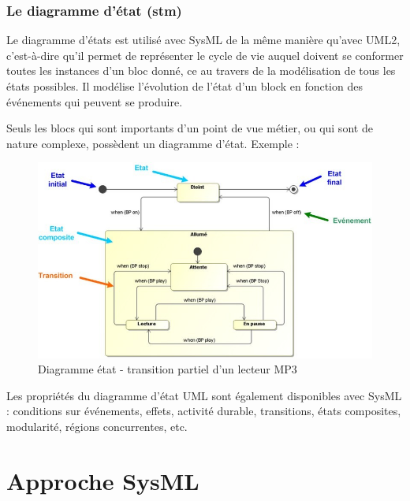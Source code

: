 \documentclass[12pt,a4paper]{report}
\begin{document}
\subsubsection{ Le diagramme d'\'{e}tat (stm)}

\noindent \begin{flushleft}
	
	
	\noindent Le diagramme d'\'{e}tats est utilis\'{e} avec SysML de la m\^{e}me mani\`{e}re qu'avec UML2, c'est-\`{a}-dire qu'il permet de repr\'{e}senter le cycle de vie auquel doivent se conformer toutes les instances d'un bloc donn\'{e}, ce au travers de la mod\'{e}lisation de tous les \'{e}tats possibles. Il mod\'{e}lise l'\'{e}volution de l'\'{e}tat d'un block en fonction des \'{e}v\'{e}nements qui peuvent se produire.
	
	\noindent Seuls les blocs qui sont importants d'un point de vue m\'{e}tier, ou qui sont de nature complexe, poss\`{e}dent un diagramme d'\'{e}tat. Exemple : 
\end{flushleft}


\begin{figure}[H]
	\centering
	\includegraphics[width=0.8\linewidth]{image24.png}
	\caption{Diagramme \'{e}tat - transition partiel d'un lecteur MP3}
	
\end{figure}

\noindent \begin{flushleft}
	Les propri\'{e}t\'{e}s du diagramme d'\'{e}tat UML sont \'{e}galement disponibles avec SysML : conditions sur \'{e}v\'{e}nements, effets, activit\'{e} durable, transitions, \'{e}tats composites, modularit\'{e}, r\'{e}gions concurrentes, etc.
	
	\noindent 
\end{flushleft}


\section{ Approche SysML}
\end{document}
